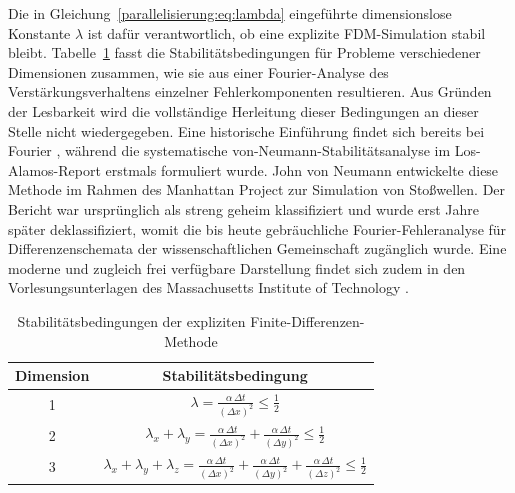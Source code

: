 Die in Gleichung~\eqref{parallelisierung:eq:lambda} eingeführte dimensionslose Konstante \(\lambda\) ist dafür verantwortlich, 
ob eine explizite FDM-Simulation stabil bleibt.  
Tabelle~\ref{parallelisierung:tab:stabilitaet_fdm} fasst die Stabilitätsbedingungen für Probleme verschiedener 
Dimensionen zusammen, wie sie aus einer Fourier-Analyse des Verstärkungsverhaltens einzelner Fehlerkomponenten 
resultieren.  
Aus Gründen der Lesbarkeit wird die vollständige Herleitung dieser Bedingungen an 
dieser Stelle nicht wiedergegeben.
Eine historische Einführung findet sich bereits bei Fourier \cite{parallelisierung:fourier1822}, während die systematische von-Neumann-Stabilitätsanalyse im Los-Alamos-Report \cite{parallelisierung:vonneumann1950} erstmals formuliert wurde. John von Neumann entwickelte diese Methode im Rahmen des Manhattan Project zur Simulation von Stoßwellen. Der Bericht war ursprünglich als streng geheim klassifiziert und wurde erst Jahre später deklassifiziert, womit die bis heute gebräuchliche Fourier-Fehleranalyse für Differenzenschemata der wissenschaftlichen Gemeinschaft zugänglich wurde. Eine moderne und zugleich frei verfügbare Darstellung findet sich zudem in den Vorlesungsunterlagen des Massachusetts Institute of Technology \cite{parallelisierung:MITnotes}.

\label{parallelisierung:sec:stabilitaetskriterien}

\begin{table}
	\centering
	\caption{Stabilitätsbedingungen der expliziten Finite-Differenzen-Methode}
	\label{parallelisierung:tab:stabilitaet_fdm}
	\begin{tabular}{|c|c|}
		\hline
		\textbf{Dimension} & \textbf{Stabilitätsbedingung} \\
		\hline
		1 & 
		\( \displaystyle \lambda = \frac{\alpha \, \Delta t}{(\Delta x)^2} \leq \frac{1}{2} \) \\
		\hline
		2 & 
		\( \displaystyle \lambda_x + \lambda_y =
		\frac{\alpha \, \Delta t}{(\Delta x)^2} +
		\frac{\alpha \, \Delta t}{(\Delta y)^2} \leq \frac{1}{2} \) \\
		\hline
		3 & 
		\( \displaystyle \lambda_x + \lambda_y + \lambda_z =
		\frac{\alpha \, \Delta t}{(\Delta x)^2} +
		\frac{\alpha \, \Delta t}{(\Delta y)^2} +
		\frac{\alpha \, \Delta t}{(\Delta z)^2} \leq \frac{1}{2} \) \\
		\hline
	\end{tabular}
\end{table}




